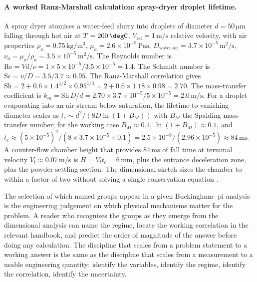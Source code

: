 \paragraph{A worked Ranz-Marshall calculation: spray-dryer droplet
lifetime.} A spray dryer atomises a water-feed slurry into droplets
of diameter $d = 50 \,\si{\micro\meter}$ falling through hot air
at $T = 200 \,\degC$, $V_{\text{rel}} = 1 \,\si{\meter\per\second}$
relative velocity, with air properties $\rho_{a} = 0.75 \,\si
{\kilogram\per\meter\cubed}$, $\mu_{a} = 2.6 \times 10^{-5} \,\si
{\pascal\second}$, $D_{\text{water-air}} = 3.7 \times 10^{-5} \,\si
{\meter\squared\per\second}$, $\nu_{a} = \mu_{a}/\rho_{a} = 3.5
\times 10^{-5} \,\si{\meter\squared\per\second}$. The Reynolds
number is $\mathrm{Re} = V d/\nu = 1 \times 5 \times 10^{-5}/3.5
\times 10^{-5} = 1.4$. The Schmidt number is $\mathrm{Sc} =
\nu/D = 3.5/3.7 \approx 0.95$. The Ranz-Marshall correlation
gives $\mathrm{Sh} = 2 + 0.6 \times 1.4^{1/2} \times 0.95^{1/3}
= 2 + 0.6 \times 1.18 \times 0.98 = 2.70$. The mass-transfer
coefficient is $k_{m} = \mathrm{Sh}\,D/d = 2.70 \times 3.7
\times 10^{-5}/5 \times 10^{-5} = 2.0 \,\si{\meter\per\second}$.
For a droplet evaporating into an air stream below saturation,
the lifetime to vanishing diameter scales as
$t_{e} \sim d^{2}/(8 D \ln(1 + B_{M}))$ with $B_{M}$ the
Spalding mass-transfer number; for the working case
$B_{M} \approx 0.1$, $\ln(1 + B_{M}) \approx 0.1$, and
$t_{e} \approx (5 \times 10^{-5})^{2}/(8 \times 3.7 \times 10^{-5}
\times 0.1) = 2.5 \times 10^{-9}/(2.96 \times 10^{-5})
\approx 84 \,\si{\milli\second}$. A counter-flow chamber height
that provides $84 \,\si{\milli\second}$ of fall time at terminal
velocity $V_{t} \approx 0.07 \,\si{\meter\per\second}$ is
$H = V_{t} t_{e} = 6 \,\si{\milli\meter}$, plus the entrance
deceleration zone, plus the powder settling section. The
dimensional sketch sizes the chamber to within a factor of two
without solving a single conservation equation
\cite{paper:ch02t3b-ranz-marshall-1952}.

The selection of which named groups appear in a given Buckingham-
pi analysis is the engineering judgement on which physical
mechanisms matter for the problem. A reader who recognises the
groups as they emerge from the dimensional analysis can name
the regime, locate the working correlation in the relevant
handbook, and predict the order of magnitude of the answer before
doing any calculation. The discipline that scales from a problem
statement to a working answer is the same as the discipline that
scales from a measurement to a usable engineering quantity:
identify the variables, identify the regime, identify the
correlation, identify the uncertainty.

